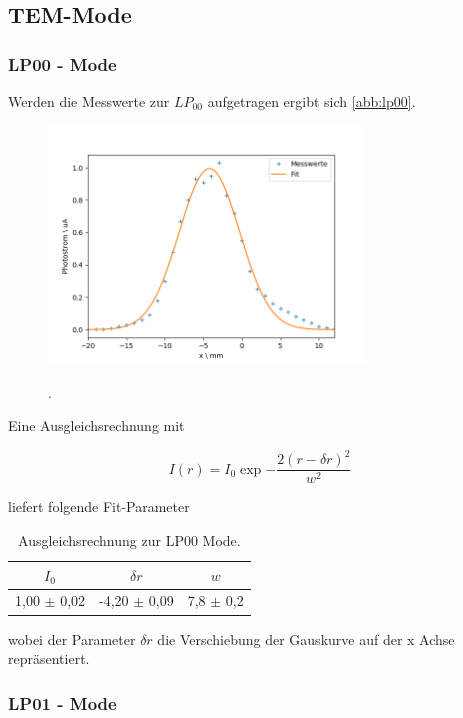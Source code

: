 \subsection{TEM-Mode}
\subsubsection{LP00 - Mode}

Werden die Messwerte zur $LP_{00}$ aufgetragen ergibt sich \autoref{abb:lp00}.


\begin{figure}[h]
  \centering
  \includegraphics[width=0.75\textwidth]{img/lp00.png}
  \caption{}.
  \label{abb:lp00}
\end{figure}

Eine Ausgleichsrechnung mit 

\begin{equation}
I(r) = I_0 \exp{- \frac{2 (r - \delta r)^2}{w^2}}
\end{equation}

liefert folgende Fit-Parameter

\begin{table}[h]
	\label{tab:lp00}
	\centering
	\begin{tabular}{ccc}
  $I_0$ & $\delta r$ & $w$ \\
  \hline
  1,00 $\pm$ 0,02 & -4,20 $\pm$ 0,09 & 7,8 $\pm$ 0,2 \\
	\end{tabular}
  \caption{Ausgleichsrechnung zur LP00 Mode.}
\end{table}

wobei der Parameter $\delta r$ die Verschiebung der Gauskurve auf der x Achse repräsentiert.

\clearpage

\subsubsection{LP01 - Mode}

